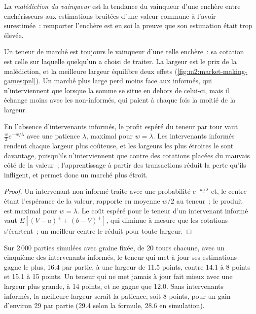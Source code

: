 \begin{definition}\label{def:m2:market-making-games:curse}
La \emph{malédiction du vainqueur} est la tendance du vainqueur d'une enchère
entre enchérisseurs aux estimations bruitées d'une valeur commune à l'avoir surestimée~: remporter
l'enchère est en soi la preuve que son estimation était trop élevée.
\end{definition}

Un teneur de marché est toujours le vainqueur d'une telle enchère~: sa cotation est celle sur laquelle
quelqu'un a choisi de traiter. La largeur est le prix de la malédiction, et la meilleure largeur équilibre
deux effets (\cref{fig:m2:market-making-games:pnl}). Un marché plus large perd moins face aux informés,
qui n'interviennent que lorsque la somme se situe en dehors de celui-ci, mais il échange moins avec les
non-informés, qui paient à chaque fois la moitié de la largeur.

\begin{proposition}\label{prop:m2:market-making-games:width}
En l'absence d'intervenants informés, le profit espéré du teneur par tour vaut $\tfrac w2 e^{-w/\lambda}$
avec une patience $\lambda$, maximal pour $w = \lambda$. Les intervenants informés rendent chaque largeur plus coûteuse,
et les largeurs les plus étroites le sont davantage, puisqu'ils n'interviennent que contre des cotations placées du mauvais côté de
la valeur~; l'apprentissage à partir des transactions réduit la perte qu'ils infligent, et permet donc
un marché plus étroit.
\end{proposition}

\begin{proof}
Un intervenant non informé traite avec une probabilité $e^{-w/\lambda}$ et, le centre étant l'espérance de la valeur,
rapporte en moyenne $w/2$ au teneur~; le produit est maximal pour $w = \lambda$.
Le coût espéré pour le teneur d'un intervenant informé vaut $E[(V - a)^+ + (b - V)^+]$, qui diminue
à mesure que les cotations s'écartent~; un meilleur centre le réduit pour toute largeur.
\end{proof}

\begin{example}\label{ex:m2:market-making-games:best}
Sur 2\,000 parties simulées avec graine fixée, de 20 tours chacune, avec un cinquième des intervenants informés, le teneur qui met à jour
ses estimations gagne le plus, 16.4 par partie, à une largeur de 11.5 points, contre 14.1 à 8 points et
15.1 à 15 points. Un teneur qui ne met jamais à jour fait mieux avec une largeur plus grande, à 14 points, et ne gagne que 12.0.
Sans intervenants informés, la meilleure largeur serait la patience, soit 8 points, pour un gain d'environ
29 par partie (29.4 selon la formule, 28.6 en simulation).
\end{example}

